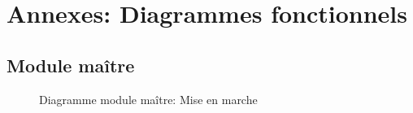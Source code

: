 \section{Annexes: Diagrammes fonctionnels}

	\subsection{Module maître}
		
		\begin{figure}[H]
			\centering
			\caption{Diagramme module maître: Mise en marche}
			\label{fig:diagrammefonctionnelmiseenmarche}
		\end{figure}
		
